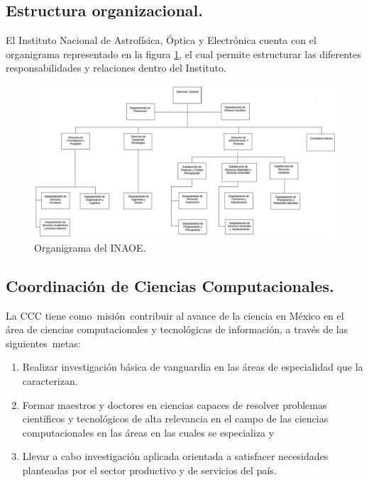 \subsection{Estructura organizacional.}
El Instituto Nacional de Astrofísica, Óptica y Electrónica cuenta con el organigrama representado en la figura \ref{organigrama}, el cual permite estructurar las diferentes responsabilidades y relaciones dentro del Instituto. 

\begin{figure}[!h]
    \centering
    \includegraphics[width=15cm]{img/organigrama.png}
    \caption{Organigrama del INAOE.}
    \label{organigrama}
\end{figure}

\subsection{Coordinación de Ciencias Computacionales.}

La CCC tiene como misión contribuir al avance de la ciencia en México en el área de ciencias computacionales y tecnológicas de información, a través de las siguientes metas:

\begin{enumerate}
    \item Realizar investigación básica de vanguardia en las áreas de especialidad que la caracterizan.
    \item Formar maestros y doctores en ciencias capaces de resolver problemas científicos y tecnológicos de alta relevancia en el campo de las ciencias computacionales en las áreas en las cuales se especializa y
    \item Llevar a cabo investigación aplicada orientada a satisfacer necesidades planteadas por el sector productivo y de servicios del país.
\end{enumerate}

